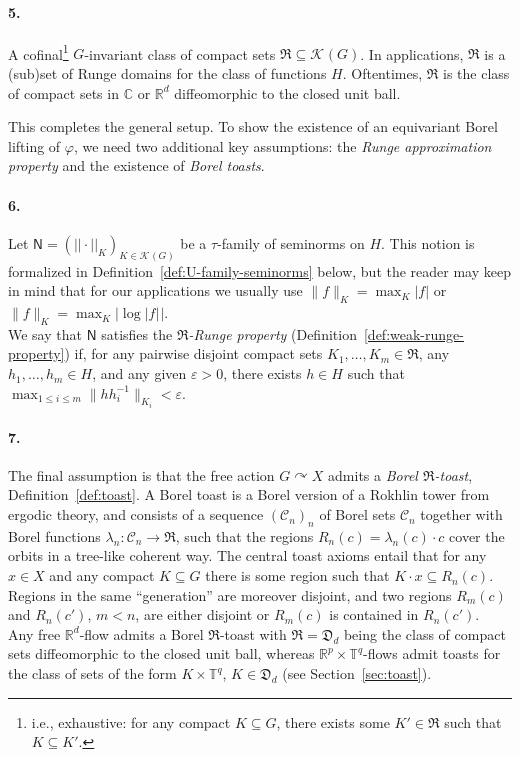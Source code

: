 \documentclass[12pt]{paper}
\numberwithin{equation}{section}
\theoremstyle{plain}
\theoremstyle{definition}
\newcommand{\C}{\mathbb{C}}
\newcommand{\R}{\mathbb{R}}
\newcommand{\Rd}{\mathbb{R}^{d}}
\newcommand{\T}{\mathbb{T}}
\newcommand{\mfD}{\mathfrak{D}}
\newcommand{\mfR}{\mathfrak{R}}
\newcommand{\vietoris}[2][]{\mathcal{K}_{#1}(#2)}
\newcommand{\unifn}{\mathsf{N}}
\newcommand{\acts}{\curvearrowright}
\newcommand{\norm}[1]{||#1||}
\renewcommand{\epsilon}{\varepsilon}
\renewcommand{\phi}{\varphi}
\begin{document}
\paragraph{5.} A cofinal\footnote{i.e., exhaustive: for any compact \(K \subseteq G\), there exists
  some \(K'\in \mfR\) such that \(K \subseteq K'\).}  \(G\)-invariant class of compact sets
\(\mfR \subseteq \vietoris{G}\).  In applications, \(\mfR\) is a (sub)set of Runge domains for the
class of functions \(H\).  Oftentimes, \(\mfR\) is the class of compact sets in \(\C\) or \(\Rd\)
diffeomorphic to the closed unit ball.

\bigskip

This completes the general setup.  To show the existence of an equivariant Borel lifting of
\(\phi\), we need two additional key assumptions: the \emph{Runge approximation property} and the
existence of \emph{Borel toasts}.

\paragraph{6.} Let \(\unifn = (\norm{\cdot}_{K})_{K \in \vietoris{G}}\) be a \(\tau\)-family of
seminorms on \(H\).  This notion is formalized in Definition~\ref{def:U-family-seminorms} below, but
the reader may keep in mind that for our applications we usually use
\(\lVert f\rVert_K=\max_K|f|\) or
\(\lVert f\rVert_K=\max_K|\log|f|\hspace{1pt}|\).\\
\phantom{ }\quad We say that \(\unifn\) satisfies the \emph{\(\mfR\)-Runge property}
(Definition~\ref{def:weak-runge-property}) if, for any pairwise disjoint compact sets
\(K_1,\ldots,K_m\in\mfR\), any \(h_1,\ldots,h_m\in H\), and any given \(\epsilon>0\), there exists
\(h\in H\) such that \(\max_{1\le i\le m}\lVert h h_i^{-1}\rVert_{K_i}<\epsilon\).

\paragraph{7.} The final assumption is that the free action \(G\acts X\) admits a \emph{Borel
  \(\mfR\)-toast}, Definition~\ref{def:toast}.  A Borel toast is a Borel version of a Rokhlin tower
from ergodic theory, and consists of a sequence \((\mathcal{C}_{n})_n\) of Borel sets
\(\mathcal{C}_n\) together with Borel functions \(\lambda_n:\mathcal{C}_n\to \mfR\), such that the
regions \(R_n(c) = \lambda_n(c)\cdot c\) cover the orbits in a tree-like coherent way.  The central
toast axioms entail that for any \(x\in X\) and any compact \(K \subseteq G\) there is some region
such that \(K\cdot x\subseteq R_n(c)\).  Regions in the same ``generation'' are moreover disjoint,
and two regions \(R_m(c)\) and \(R_n(c')\), \(m<n\), are either disjoint
or \(R_m(c)\) is contained in \(R_n(c')\).\\
\phantom{ }\quad Any free \(\Rd\)-flow admits a Borel \(\mfR\)-toast with
\(\mfR = \mfD_{d}\) being the class of compact sets diffeomorphic to the closed unit ball, whereas
\(\R^{p}\times\T^{q}\)-flows admit toasts for the class of sets of the form \(K \times \T^{q}\), \(K \in
\mfD_{d}\) (see Section~\ref{sec:toast}).
\end{document}

